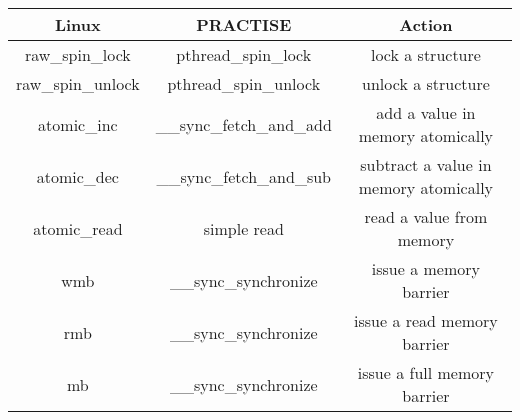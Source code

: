 \centering
\small
\renewcommand{\arraystretch}{1.5}
\begin{tabular}{|c|c|c|}
  \hline \textbf{Linux}& \textbf{PRACTISE}& \textbf{Action}\\[5pt]
  \hline raw\_spin\_lock   & pthread\_spin\_lock       & lock a structure\\
  \hline raw\_spin\_unlock & pthread\_spin\_unlock     & unlock a structure\\
  \hline atomic\_inc       & \_\_sync\_fetch\_and\_add & add a value in memory atomically\\
  \hline atomic\_dec       & \_\_sync\_fetch\_and\_sub & subtract a value in memory atomically\\
  \hline atomic\_read      & simple read               & read a value from memory \\ 
  \hline wmb               & \_\_sync\_synchronize     & issue a memory barrier \\
  \hline rmb               & \_\_sync\_synchronize     & issue a read memory barrier \\
  \hline mb                & \_\_sync\_synchronize     & issue a full memory barrier \\\hline
\end{tabular}

